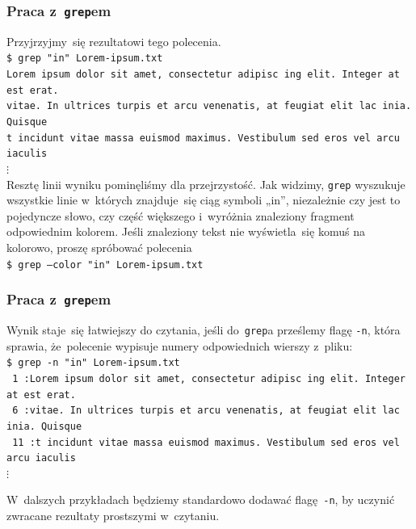 \documentclass[10pt,t]{beamer}
\begin{document}
\begin{frame}
  \frametitle{Praca z~\texttt{grep}em}


  Przyjrzyjmy~się rezultatowi tego polecenia. \\
  \texttt{\$ grep "in"{} Lorem-ipsum.txt} \\
  \texttt{Lorem ipsum dolor sit amet, consectetur
    adipisc{\color{red} in}g elit. Integer at est erat.} \\
  \texttt{vitae. In ultrices turpis et arcu venenatis, at feugiat elit
    lac{\color{red} in}ia. Quisque} \\
  \texttt{t{\color{red} in}cidunt vitae massa euismod maximus. Vestibulum
    sed eros vel arcu iaculis} \\
  \hspace{1em} $\vdots$ \\
  Resztę linii wyniku pominęliśmy dla przejrzystość. Jak widzimy,
  \texttt{grep} wyszukuje wszystkie linie w~których znajduje~się ciąg
  symboli „in”, niezależnie czy jest to pojedyncze słowo, czy część
  większego i~wyróżnia znaleziony fragment odpowiednim kolorem. Jeśli
  znaleziony tekst nie wyświetla~się komuś na kolorowo, proszę spróbować
  polecenia \\
  \texttt{\$ grep --color "in"{} Lorem-ipsum.txt}

\end{frame}





\begin{frame}
  \frametitle{Praca z~\texttt{grep}em}


  Wynik staje~się łatwiejszy do czytania, jeśli do~\texttt{grep}a prześlemy
  flagę \texttt{-n}, która sprawia, że~polecenie wypisuje numery
  odpowiednich wierszy z~pliku: \\
  \texttt{\$ grep -n "in"{} Lorem-ipsum.txt} \\
  \texttt{{\color{green} 1}{\color{jAxisBlue} :}Lorem ipsum dolor sit amet,
    consectetur adipisc{\color{red} in}g elit. Integer at est erat.} \\
  \texttt{{\color{green} 6}{\color{jAxisBlue} :}vitae. In ultrices turpis et
    arcu venenatis, at feugiat elit lac{\color{red} in}ia. Quisque} \\
  \texttt{{\color{green} 11}{\color{jAxisBlue} :}t{\color{red} in}cidunt
    vitae massa euismod maximus. Vestibulum sed eros vel arcu iaculis} \\
  \hspace{1em} $\vdots$

  W~dalszych przykładach będziemy standardowo dodawać flagę~\texttt{-n}, by
  uczynić zwracane rezultaty prostszymi w~czytaniu.

\end{frame}
\end{document}
